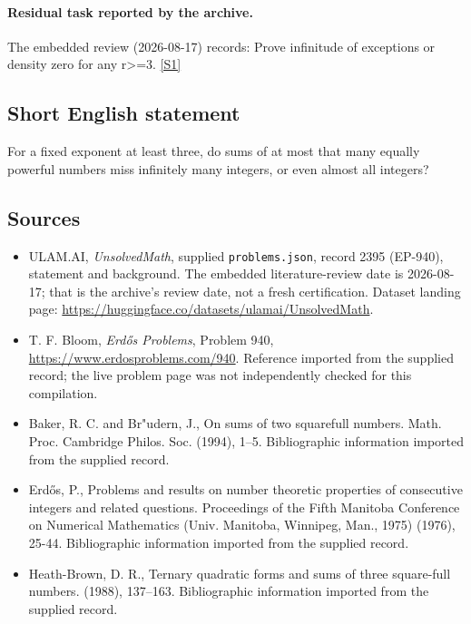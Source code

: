 \documentclass[11pt,a4paper]{article}
\newcommand{\sref}[2]{\hyperlink{source:#1:#2}{[S#2]}}
\begin{document}
\paragraph{Residual task reported by the archive.}

The embedded review (2026-08-17) records: Prove infinitude of exceptions or density zero for any r>=3. \sref{2395}{1}

\subsection{Short English statement}

For a fixed exponent at least three, do sums of at most that many equally powerful numbers miss infinitely many integers, or even almost all integers?

\subsection{Sources}

{\small

\begin{itemize}

\item[\hypertarget{source:2395:1}{S1}] ULAM.AI, \emph{UnsolvedMath}, supplied \texttt{problems.json}, record 2395 (EP-940), statement and background. The embedded literature-review date is 2026-08-17; that is the archive’s review date, not a fresh certification. Dataset landing page: \url{https://huggingface.co/datasets/ulamai/UnsolvedMath}.

\item[\hypertarget{source:2395:2}{S2}] T. F. Bloom, \emph{Erdős Problems}, Problem 940, \url{https://www.erdosproblems.com/940}. Reference imported from the supplied record; the live problem page was not independently checked for this compilation.

\item[\hypertarget{source:2395:3}{S3}] Baker, R. C. and Br"udern, J., On sums of two squarefull numbers. Math. Proc. Cambridge Philos. Soc. (1994), 1--5. Bibliographic information imported from the supplied record.

\item[\hypertarget{source:2395:4}{S4}] Erd\H{o}s, P., Problems and results on number theoretic properties of consecutive integers and related questions. Proceedings of the Fifth Manitoba Conference on Numerical Mathematics (Univ. Manitoba, Winnipeg, Man., 1975) (1976), 25-44. Bibliographic information imported from the supplied record.

\item[\hypertarget{source:2395:5}{S5}] Heath-Brown, D. R., Ternary quadratic forms and sums of three square-full numbers. (1988), 137--163. Bibliographic information imported from the supplied record.

\end{itemize}

}

\label{end:2395}
\end{document}
